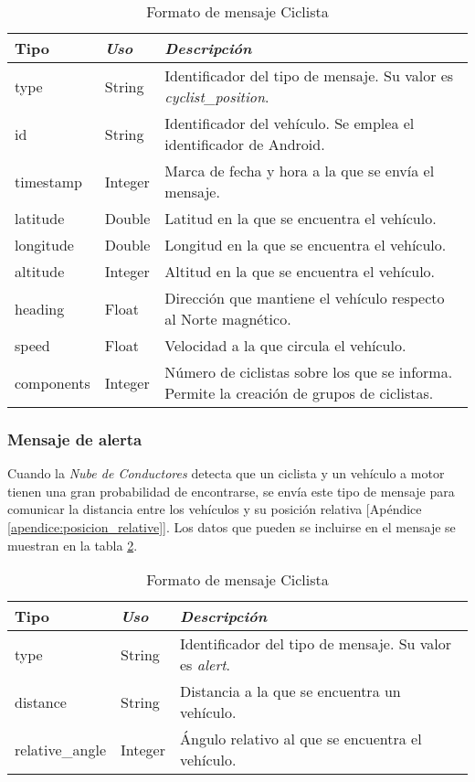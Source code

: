 \begin{table}[H]
	\centering
	\caption{Formato de mensaje Ciclista}\label{tab:CamposMensajePosCiclistaNubeConductores}
	\begin{tabular}{lll}
		\toprule
			\textbf{Tipo} & \emph{Uso} & \emph{Descripción}\\
		\midrule
			type			&	String	&	Identificador del tipo de mensaje. Su valor es \emph{cyclist\_position}.	\\
			id			&	String	&	Identificador del vehículo. Se emplea el identificador de Android.		\\
			timestamp		&	Integer	&	Marca de fecha y hora a la que se envía el mensaje.					\\
			latitude		&	Double	&	Latitud en la que se encuentra el vehículo. 						\\
			longitude		&	Double	&	Longitud en la que se encuentra el vehículo.						\\
			altitude		&	Integer	&	Altitud en la que se encuentra el vehículo.						\\
			heading		&	Float		&	Dirección que mantiene el vehículo respecto al Norte magnético.		\\
			speed		&	Float		&	Velocidad a la que circula el vehículo.							\\
			components 	&	Integer	&	Número de ciclistas sobre los que se informa.	Permite la creación de
				grupos de ciclistas. 																	\\
		\bottomrule
	\end{tabular}
\end{table}

\subsubsection{Mensaje de alerta}\label{sssection:MensajeAlerta}
Cuando la \emph{Nube de Conductores} detecta que un ciclista y un vehículo a motor
tienen una gran probabilidad de encontrarse, se envía este tipo de mensaje para
comunicar la distancia entre los vehículos y su posición relativa [Apéndice \ref{apendice:posicion_relative}].
Los datos que pueden se incluirse en el mensaje se muestran en la tabla \ref{tab:CamposMensajePosCiclistaNubeConductores}.

\begin{table}[H]
	\centering
	\caption{Formato de mensaje Ciclista}\label{tab:CamposMensajePosCiclistaNubeConductores}
	\begin{tabular}{lll}
		\toprule
			\textbf{Tipo} & \emph{Uso} & \emph{Descripción}\\
		\midrule
			type			&	String	&	Identificador del tipo de mensaje. Su valor es \emph{alert}.	\\
			distance		&	String	&	Distancia a la que se encuentra un vehículo.				\\
			relative\_angle	&	Integer	&	\'Angulo relativo al que se encuentra el vehículo.			\\
		\bottomrule
	\end{tabular}
\end{table}
